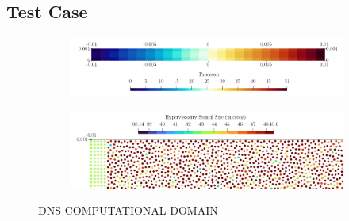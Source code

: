 \subsection{Test Case}

\begin{figure}[t]
\centering
    \begin{subfigure}{0.99\textwidth}
    \centering
    \includegraphics[scale=0.25]{assets/graphs/flame-sim-discretisation.png}
    \caption{}
    \label{fig:disc1}
    \end{subfigure}

\vspace*{0.5em}

    \begin{subfigure}{0.99\textwidth}
    \centering
    \includegraphics[scale=0.25]{assets/graphs/flame-sim-discretisation_zoom.png}
    \caption{}
    \label{fig:disc2}
    \end{subfigure}
\caption{DNS COMPUTATIONAL DOMAIN}
\label{fig:disc}
\end{figure}




